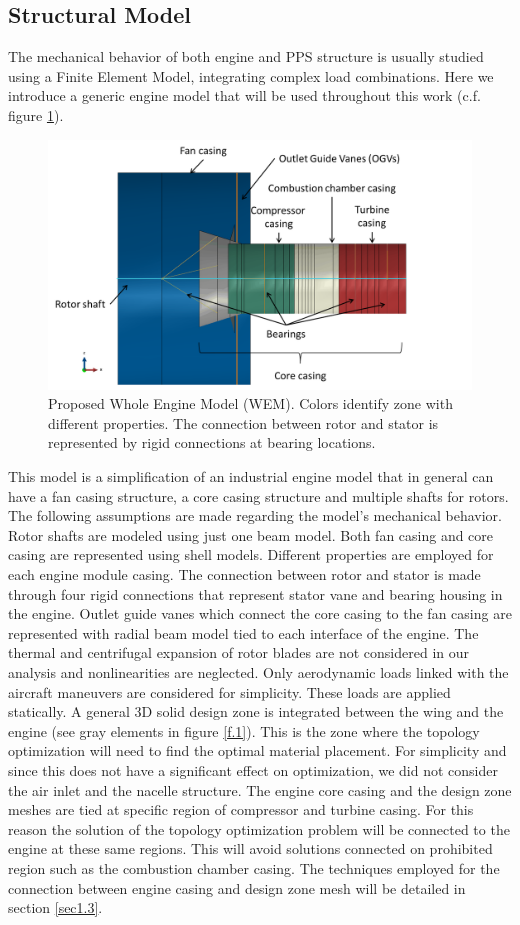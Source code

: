 \subsection{Structural Model}
\label{ssec1.2.1}
The mechanical behavior of both engine and PPS structure is usually studied using a Finite Element Model, integrating complex load combinations. Here we introduce a generic engine model that will be used throughout this work (c.f. figure \ref{enginewem}). 
\begin{figure}[hbt!]
\centering
\includegraphics[width=1\textwidth]{images/Ch1/enginegeometry}
\caption{Proposed Whole Engine Model (WEM). Colors identify zone with different properties. The connection between rotor and stator is represented by rigid connections at bearing locations.\label{enginewem}}
\end{figure}
This model is a simplification of an industrial engine model that in general can have a fan casing structure, a core casing structure and multiple shafts for rotors. The following assumptions are made regarding the model's mechanical behavior. Rotor shafts are modeled using just one beam model. Both fan casing and core casing are represented using shell models. Different properties are employed for each engine module casing. The connection between rotor and stator is made through four rigid connections that represent stator vane and bearing housing in the engine. Outlet guide vanes which connect the core casing to the fan casing are represented with radial beam model tied to each interface of the engine. The thermal and centrifugal expansion of rotor blades are not considered in our analysis and nonlinearities are neglected. Only aerodynamic loads linked with the aircraft maneuvers are considered for simplicity. These loads are applied statically. A general 3D solid design zone is integrated between the wing and the engine (see gray elements in figure \ref{f.1}). This is the zone where the topology optimization will need to find the optimal material placement. For simplicity and since this does not have a significant effect on optimization, we did not consider the air inlet and the nacelle structure.  The engine core casing and the design zone meshes are tied at specific region of compressor and turbine casing. For this reason the solution of the topology optimization problem will be connected to the engine at these same regions. This will avoid solutions connected on prohibited region such as the combustion chamber casing. The techniques employed for the connection between engine casing and design zone mesh will be detailed in section \ref{sec1.3}.
